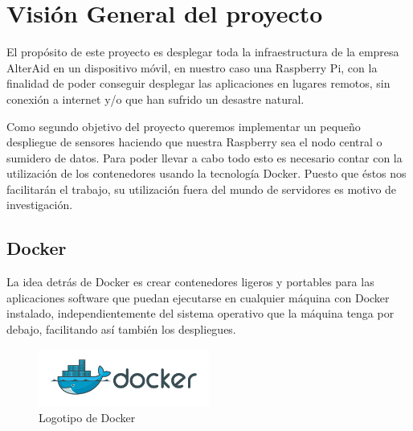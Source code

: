 \chapter{Visión General del proyecto}

El propósito de este proyecto es desplegar toda la infraestructura de la empresa AlterAid en un dispositivo móvil, en nuestro caso una Raspberry Pi, con la finalidad de poder conseguir desplegar las aplicaciones en lugares remotos, sin conexión a internet y/o que han sufrido un desastre natural.

Como segundo objetivo del proyecto queremos implementar un pequeño despliegue de sensores haciendo que nuestra Raspberry sea el nodo central o sumidero de datos. Para poder llevar a cabo todo esto es necesario contar con la utilización de los contenedores usando la tecnología Docker. Puesto que éstos nos facilitarán el trabajo, su utilización fuera del mundo de servidores es motivo de investigación.

\section{Docker}

La idea detrás de Docker es crear contenedores ligeros y portables para las aplicaciones software que puedan ejecutarse en cualquier máquina con Docker instalado, independientemente del sistema operativo que la máquina tenga por debajo, facilitando así también los despliegues.

\begin{figure}[htb]
\begin{center}
\includegraphics[width=0.5\textwidth]{./setup/dockerLogo}
\caption{Logotipo de Docker}
\label{F:prova}
\end{center}
\end{figure}



